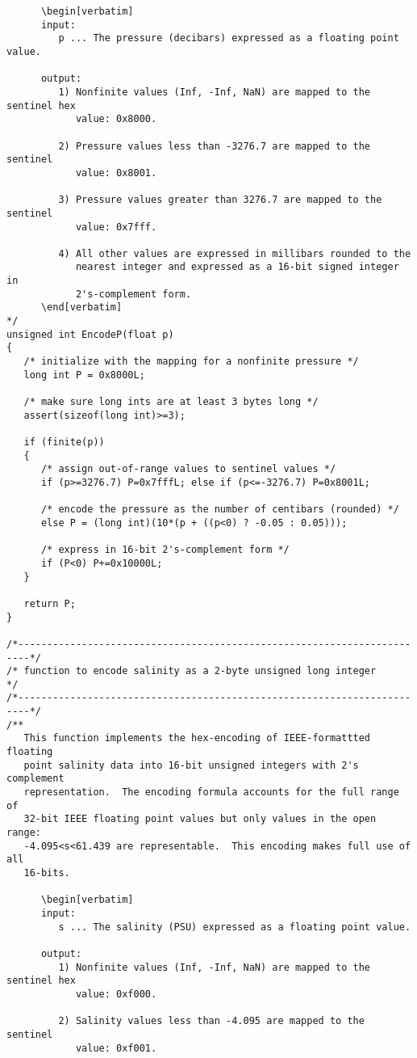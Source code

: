 {\begin{verbatim}
      \begin[verbatim]
      input:
         p ... The pressure (decibars) expressed as a floating point value.

      output:
         1) Nonfinite values (Inf, -Inf, NaN) are mapped to the sentinel hex
            value: 0x8000.

         2) Pressure values less than -3276.7 are mapped to the sentinel
            value: 0x8001.

         3) Pressure values greater than 3276.7 are mapped to the sentinel
            value: 0x7fff.

         4) All other values are expressed in millibars rounded to the
            nearest integer and expressed as a 16-bit signed integer in
            2's-complement form.
      \end[verbatim]
*/
unsigned int EncodeP(float p)
{
   /* initialize with the mapping for a nonfinite pressure */
   long int P = 0x8000L;

   /* make sure long ints are at least 3 bytes long */
   assert(sizeof(long int)>=3);
   
   if (finite(p))
   {
      /* assign out-of-range values to sentinel values */
      if (p>=3276.7) P=0x7fffL; else if (p<=-3276.7) P=0x8001L;

      /* encode the pressure as the number of centibars (rounded) */
      else P = (long int)(10*(p + ((p<0) ? -0.05 : 0.05)));

      /* express in 16-bit 2's-complement form */
      if (P<0) P+=0x10000L;
   }

   return P;
} 

/*------------------------------------------------------------------------*/
/* function to encode salinity as a 2-byte unsigned long integer          */
/*------------------------------------------------------------------------*/
/**
   This function implements the hex-encoding of IEEE-formattted floating
   point salinity data into 16-bit unsigned integers with 2's complement
   representation.  The encoding formula accounts for the full range of
   32-bit IEEE floating point values but only values in the open range:
   -4.095<s<61.439 are representable.  This encoding makes full use of all
   16-bits.

      \begin[verbatim]
      input:
         s ... The salinity (PSU) expressed as a floating point value.

      output:
         1) Nonfinite values (Inf, -Inf, NaN) are mapped to the sentinel hex
            value: 0xf000.

         2) Salinity values less than -4.095 are mapped to the sentinel
            value: 0xf001.


\end{verbatim}}
